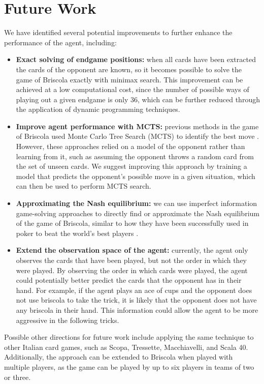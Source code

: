 \section{Future Work}
We have identified several potential improvements to further enhance the performance of the agent, including:
\begin{itemize}
    \item \textbf{Exact solving of endgame positions:} when all cards have been extracted the cards of the opponent are known, so it becomes possible to solve the game of Briscola exactly with minimax search. This improvement can be achieved at a low computational cost, since the number of possible ways of playing out a given endgame is only 36, which can be further reduced through the application of dynamic programming techniques.
    \item \textbf{Improve agent performance with MCTS:} previous methods in the game of Briscola used Monte Carlo Tree Search (MCTS) to identify the best move \cite{Briscola-mcts-Playing-Algorithm, villa2013-briscola-mcts}. However, these approaches relied on a model of the opponent rather than learning from it, such as assuming the opponent throws a random card from the set of unseen cards. We suggest improving this approach by training a model that predicts the opponent's possible move in a given situation, which can then be used to perform MCTS search.
    \item \textbf{Approximating the Nash equilibrium:} we can use imperfect information game-solving approaches to directly find or approximate the Nash equilibrium of the game of Briscola, similar to how they have been successfully used in poker to beat the world's best players \cite{libratus}.
    \item \textbf{Extend the observation space of the agent:} currently, the agent only observes the cards that have been played, but not the order in which they were played. By observing the order in which cards were played, the agent could potentially better predict the cards that the opponent has in their hand. For example, if the agent plays an ace of cups and the opponent does not use briscola to take the trick, it is likely that the opponent does not have any briscola in their hand. This information could allow the agent to be more aggressive in the following tricks.
\end{itemize}
Possible other directions for future work include applying the same technique to other Italian card games, such as Scopa, Tressette, Macchiavelli, and Scala 40. Additionally, the approach can be extended to Briscola when played with multiple players, as the game can be played by up to six players in teams of two or three.
